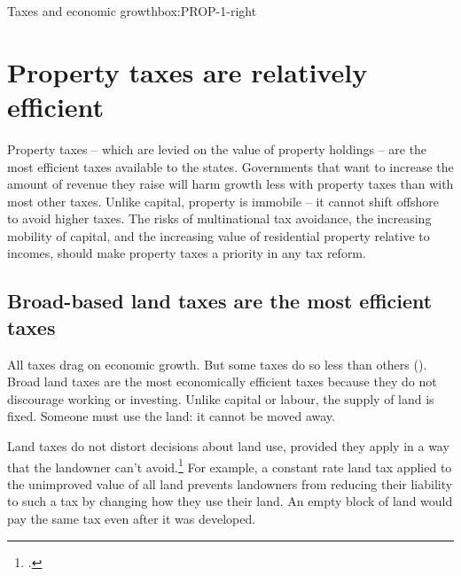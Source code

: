\documentclass[twoside,english]{Dianab5ona4portrait}
\begin{document}
{\begin{rultrabox}{Taxes and economic growth}{box:PROP-1-right}
\begin{figure}[H]
\end{figure}
\end{rultrabox}}



\chapter{Property taxes are relatively efficient}
Property taxes – which are levied on the value of property holdings – are the most efficient taxes available to the states. Governments that want to increase the amount of revenue they raise will harm growth less with property taxes than with most other taxes. Unlike capital, property is immobile – it cannot shift offshore to avoid higher taxes. The risks of multinational tax avoidance, the increasing mobility of capital, and the increasing value of residential property relative to incomes, should make property taxes a priority in any tax reform. 


%
\section{Broad-based land taxes are the most efficient taxes}
All taxes drag on economic growth. But some taxes do so less than others (). Broad land taxes are the most economically efficient taxes because they do not discourage working or investing. Unlike capital or labour, the supply of land is fixed. Someone must use the land: it cannot be moved away. 

Land taxes do not distort decisions about land use, provided they apply in a way that the landowner can’t avoid.\footcite[][247]{HenryTaxReview2010}  For example, a constant rate land tax applied to the unimproved value of all land prevents landowners from reducing their liability to such a tax by changing how they use their land. An empty block of land would pay the same tax even after it was developed. 
\end{document}
